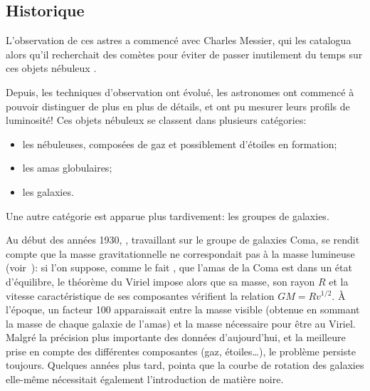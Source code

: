 		\subsection{Historique}

			L'observation de ces astres a commencé avec Charles Messier, qui les
			catalogua alors qu'il recherchait des comètes pour éviter de passer
			inutilement du temps sur ces objets \og nébuleux \fg{}.

			Depuis, les techniques d'observation ont évolué, les astronomes ont
			commencé à pouvoir distinguer de plus en plus de détails, et ont pu
			mesurer leurs profils de luminosité! Ces objets nébuleux se classent dans
			plusieurs catégories:
			\begin{itemize}
				\item les nébuleuses, composées de gaz et possiblement d'étoiles en formation;
				\item les amas globulaires;
				\item les galaxies.
			\end{itemize}
			Une autre catégorie est apparue plus tardivement: les groupes de galaxies.

			Au début des années 1930, , travaillant sur
			le groupe de galaxies Coma, se rendit compte que la
			masse gravitationnelle ne correspondait pas à la masse lumineuse 
			(voir~\cite{1933AcHPh...6..110Z}): si l'on suppose,
			comme le fait , que l'amas de la Coma est
			dans un état d'équilibre, le théorème du Viriel impose
			alors que sa masse, son rayon $R$ et la vitesse
			caractéristique de ses composantes vérifient la
			relation $GM = R v^{1/2}$. À l'époque, un facteur 100
			apparaissait entre la masse visible (obtenue en sommant
			la masse de chaque galaxie de l'amas) et la masse
			nécessaire pour être au Viriel. Malgré la précision
			plus importante des données d'aujourd'hui, et la
			meilleure prise en compte des différentes composantes
			(gaz, étoiles\ldots), le problème persiste toujours.
			Quelques années plus tard, \cite{1939LicOB..19...41B} pointa que la courbe de rotation des
			galaxies elle-même nécessitait également l'introduction de matière noire.



